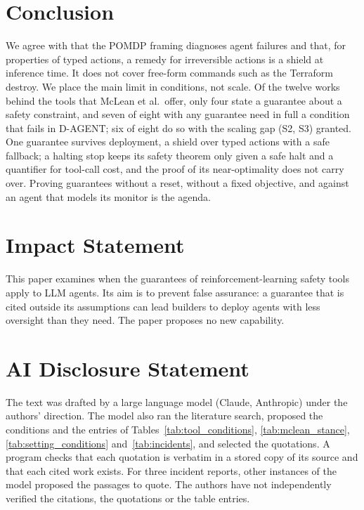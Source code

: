 \documentclass{article}
\begin{document}
\hypertarget{sec:conclusion}{%
\section{Conclusion}\label{sec:conclusion}}

We agree with \citet{mclean2026} that the POMDP framing diagnoses agent failures and that, for properties of typed actions, a remedy for irreversible actions is a shield at inference time. It does not cover free-form commands such as the Terraform destroy. We place the main limit in conditions, not scale. Of the twelve works behind the tools that McLean et al.~offer, only four state a guarantee about a safety constraint, and seven of eight with any guarantee need in full a condition that fails in D-AGENT; six of eight do so with the scaling gap (S2, S3) granted. One guarantee survives deployment, a shield over typed actions with a safe fallback; a halting stop keeps its safety theorem only given a safe halt and a quantifier for tool-call cost, and the proof of its near-optimality does not carry over. Proving guarantees without a reset, without a fixed objective, and against an agent that models its monitor is the agenda.

\FloatBarrier
\section*{Impact Statement}
This paper examines when the guarantees of reinforcement-learning safety tools apply to LLM agents. Its aim is to prevent false assurance: a guarantee that is cited outside its assumptions can lead builders to deploy agents with less oversight than they need. The paper proposes no new capability.

\section*{AI Disclosure Statement}
The text was drafted by a large language model (Claude, Anthropic) under the authors' direction. The model also ran the literature search, proposed the conditions and the entries of Tables~\ref{tab:tool_conditions}, \ref{tab:mclean_stance}, \ref{tab:setting_conditions} and~\ref{tab:incidents}, and selected the quotations. A program checks that each quotation is verbatim in a stored copy of its source and that each cited work exists. For three incident reports, other instances of the model proposed the passages to quote. The authors have not independently verified the citations, the quotations or the table entries.
\end{document}

